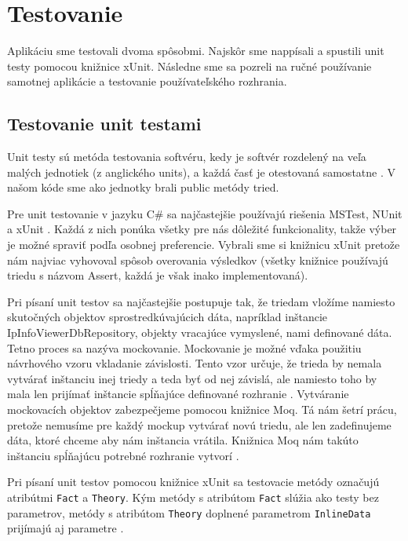 \chapter{Testovanie}

\label{kap:testovanie}

Aplikáciu sme testovali dvoma spôsobmi. Najskôr sme nappísali a spustili unit testy pomocou knižnice xUnit. Následne sme sa pozreli na ručné používanie 
samotnej aplikácie a testovanie používateľského rozhrania.

\section{Testovanie unit testami}
Unit testy sú metóda testovania softvéru, kedy je softvér rozdelený na veľa malých jednotiek (z anglického units), a každá časť je otestovaná 
samostatne \cite{unit_tests}. V našom kóde sme ako jednotky brali public metódy tried. 

Pre unit testovanie v jazyku C\# sa najčastejšie používajú riešenia MSTest, NUnit a xUnit \cite{unit_test_comparison}. Každá z nich ponúka 
všetky pre nás dôležité funkcionality, takže výber je možné spraviť podľa osobnej preferencie. Vybrali sme si knižnicu xUnit pretože nám 
najviac vyhovoval spôsob overovania výsledkov (všetky knižnice používajú triedu s názvom Assert, každá je však inako implementovaná).

Pri písaní unit testov sa najčastejšie postupuje tak, že triedam vložíme namiesto skutočných objektov sprostredkúvajúcich dáta, napríklad inštancie 
IpInfoViewerDbRepository, objekty vracajúce vymyslené, nami definované dáta. Tetno proces sa nazýva mockovanie. Mockovanie je možné vďaka použitiu návrhového 
vzoru vkladanie závislosti. Tento vzor určuje, že trieda by nemala vytvárať inštanciu inej triedy a teda byť od nej závislá, ale namiesto toho by mala len 
prijímať inštancie spĺňajúce definované rozhranie \cite{dependency_injection}. Vytváranie mockovacích objektov zabezpečjeme pomocou knižnice Moq. Tá nám šetrí 
prácu, pretože nemusíme pre každý mockup vytvárať novú triedu, ale len zadefinujeme dáta, ktoré chceme aby nám inštancia vrátila. Knižnica Moq nám 
takúto inštanciu spĺňajúcu potrebné rozhranie vytvorí \cite{moq}.

Pri písaní unit testov pomocou knižnice xUnit sa testovacie metódy označujú atribútmi \lstinline{Fact} a \lstinline{Theory}. Kým metódy s atribútom 
\lstinline{Fact} slúžia ako testy bez parametrov, metódy s atribútom \lstinline{Theory} doplnené parametrom \lstinline{InlineData} prijímajú aj parametre 
\cite{xunit_docs}.


